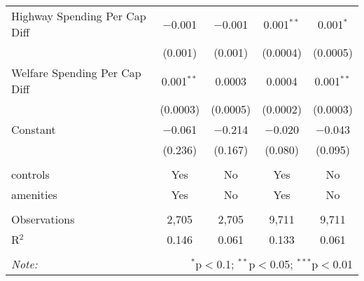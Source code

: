 \begin{table}[!htbp]
\begin{tabular}{@{\extracolsep{5pt}}lcccc}
  Highway Spending Per Cap Diff & $-$0.001 & $-$0.001 & 0.001$^{**}$ & 0.001$^{*}$ \\ 
  & (0.001) & (0.001) & (0.0004) & (0.0005) \\ 
  Welfare Spending Per Cap Diff & 0.001$^{**}$ & 0.0003 & 0.0004 & 0.001$^{**}$ \\ 
  & (0.0003) & (0.0005) & (0.0002) & (0.0003) \\ 
  Constant & $-$0.061 & $-$0.214 & $-$0.020 & $-$0.043 \\ 
  & (0.236) & (0.167) & (0.080) & (0.095) \\ 
 \hline \\[-1.8ex] 
controls & Yes & No & Yes & No \\ 
amenities & Yes & No & Yes & No \\ 
\hline \\[-1.8ex] 
Observations & 2,705 & 2,705 & 9,711 & 9,711 \\ 
R$^{2}$ & 0.146 & 0.061 & 0.133 & 0.061 \\ 
\hline 
\hline \\[-1.8ex] 
\textit{Note:}  & \multicolumn{4}{r}{$^{*}$p$<$0.1; $^{**}$p$<$0.05; $^{***}$p$<$0.01} \\ 
\end{tabular} 
\end{table} 

